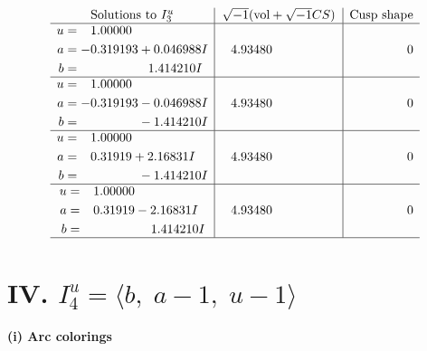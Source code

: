 \documentclass[1p]{elsarticle_modified}
\theoremstyle{definition}
\newcommand{\I}{\sqrt{-1}}
\begin{document}
$$\begin{array}{c|c|c}  
\text{Solutions to }I^u_{3}& \I (\text{vol} + \sqrt{-1}CS) & \text{Cusp shape}\\
 \hline 
\begin{aligned}
u &= \phantom{-}1.00000\phantom{ +0.000000I} \\
a &= -0.319193 + 0.046988 I \\
b &= \phantom{-0.000000 -}1.414210 I\end{aligned}
 & \phantom{-}4.93480\phantom{ +0.000000I} & \phantom{-0.000000 } 0 \\ \hline\begin{aligned}
u &= \phantom{-}1.00000\phantom{ +0.000000I} \\
a &= -0.319193 - 0.046988 I \\
b &= \phantom{-0.000000 } -1.414210 I\end{aligned}
 & \phantom{-}4.93480\phantom{ +0.000000I} & \phantom{-0.000000 } 0 \\ \hline\begin{aligned}
u &= \phantom{-}1.00000\phantom{ +0.000000I} \\
a &= \phantom{-}0.31919 + 2.16831 I \\
b &= \phantom{-0.000000 } -1.414210 I\end{aligned}
 & \phantom{-}4.93480\phantom{ +0.000000I} & \phantom{-0.000000 } 0 \\ \hline\begin{aligned}
u &= \phantom{-}1.00000\phantom{ +0.000000I} \\
a &= \phantom{-}0.31919 - 2.16831 I \\
b &= \phantom{-0.000000 -}1.414210 I\end{aligned}
 & \phantom{-}4.93480\phantom{ +0.000000I} & \phantom{-0.000000 } 0\\
 \hline 
 \end{array}$$\newpage\newpage\renewcommand{\arraystretch}{1}
\centering \section*{IV. $I^u_{4}= \langle b,\;a-1,\;u-1 \rangle$}
\flushleft \textbf{(i) Arc colorings}\\
\end{document}
